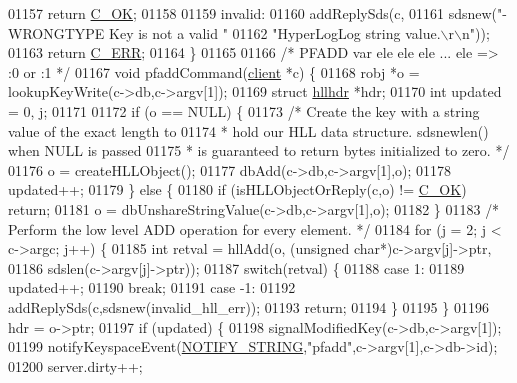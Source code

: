 \begin{DoxyCode}
{{01157     \textcolor{keywordflow}{return} \hyperlink{server_8h_a303769ef1065076e68731584e758d3e1}{C\_OK};
01158 
01159 invalid:
01160     addReplySds(c,
01161         sdsnew(\textcolor{stringliteral}{"-WRONGTYPE Key is not a valid "}
01162                \textcolor{stringliteral}{"HyperLogLog string value.\(\backslash\)r\(\backslash\)n"}));
01163     \textcolor{keywordflow}{return} \hyperlink{server_8h_af98ac28d5f4d23d7ed5985188e6fb7d1}{C\_ERR};
01164 \}
01165 
01166 \textcolor{comment}{/* PFADD var ele ele ele ... ele => :0 or :1 */}
01167 \textcolor{keywordtype}{void} pfaddCommand(\hyperlink{structclient}{client} *c) \{
01168     robj *o = lookupKeyWrite(c->db,c->argv[1]);
01169     \textcolor{keyword}{struct} \hyperlink{structhllhdr}{hllhdr} *hdr;
01170     \textcolor{keywordtype}{int} updated = 0, j;
01171 
01172     \textcolor{keywordflow}{if} (o == NULL) \{
01173         \textcolor{comment}{/* Create the key with a string value of the exact length to}
01174 \textcolor{comment}{         * hold our HLL data structure. sdsnewlen() when NULL is passed}
01175 \textcolor{comment}{         * is guaranteed to return bytes initialized to zero. */}
01176         o = createHLLObject();
01177         dbAdd(c->db,c->argv[1],o);
01178         updated++;
01179     \} \textcolor{keywordflow}{else} \{
01180         \textcolor{keywordflow}{if} (isHLLObjectOrReply(c,o) != \hyperlink{server_8h_a303769ef1065076e68731584e758d3e1}{C\_OK}) \textcolor{keywordflow}{return};
01181         o = dbUnshareStringValue(c->db,c->argv[1],o);
01182     \}
01183     \textcolor{comment}{/* Perform the low level ADD operation for every element. */}
01184     \textcolor{keywordflow}{for} (j = 2; j < c->argc; j++) \{
01185         \textcolor{keywordtype}{int} retval = hllAdd(o, (\textcolor{keywordtype}{unsigned} \textcolor{keywordtype}{char}*)c->argv[j]->ptr,
01186                                sdslen(c->argv[j]->ptr));
01187         \textcolor{keywordflow}{switch}(retval) \{
01188         \textcolor{keywordflow}{case} 1:
01189             updated++;
01190             \textcolor{keywordflow}{break};
01191         \textcolor{keywordflow}{case} -1:
01192             addReplySds(c,sdsnew(invalid\_hll\_err));
01193             \textcolor{keywordflow}{return};
01194         \}
01195     \}
01196     hdr = o->ptr;
01197     \textcolor{keywordflow}{if} (updated) \{
01198         signalModifiedKey(c->db,c->argv[1]);
01199         notifyKeyspaceEvent(\hyperlink{server_8h_a1902292b73b71baa65d86db2d61b47ce}{NOTIFY\_STRING},\textcolor{stringliteral}{"pfadd"},c->argv[1],c->db->id);
01200         server.dirty++;
}}
\end{DoxyCode}
